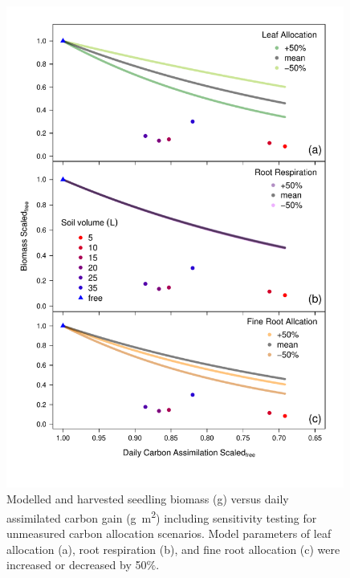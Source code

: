 \documentclass[a4paper]{article}\usepackage[]{graphicx}\usepackage[]{color}
\begin{document}
\begin{figure}[h!]
    \centering
    \includegraphics[width=0.99\textwidth]{gc_Day_scenario.pdf}
    \caption{Modelled and harvested seedling biomass (g) versus daily assimilated carbon gain (g~m\textsuperscript{2}) including sensitivity testing for unmeasured carbon allocation scenarios.  Model parameters of leaf allocation (a), root respiration (b), and fine root allocation (c) were increased or decreased by 50$\%$.}
    \label{fig:figureSI1}
\end{figure}

\clearpage


\end{document}
